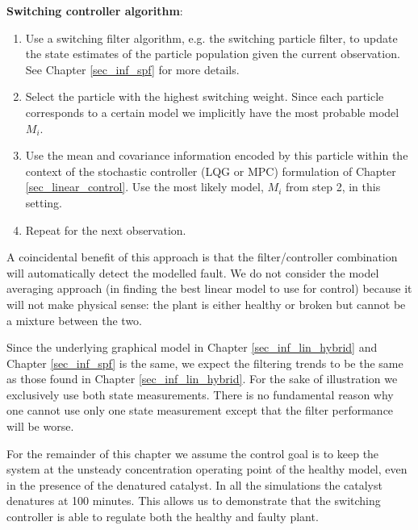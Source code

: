 \textbf{Switching controller algorithm}:
\begin{enumerate}
\item
Use a switching filter algorithm, e.g. the switching particle filter, to update the state estimates of the particle population given the current observation. See Chapter \ref{sec_inf_spf} for more details.
\item
Select the particle with the highest switching weight. Since each particle corresponds to a certain model we implicitly have the most probable model $M_i$.
\item
Use the mean and covariance information encoded by this particle within the context of the stochastic controller (LQG or MPC) formulation of Chapter \ref{sec_linear_control}. Use the most likely model, $M_i$ from step 2, in this setting.
\item
Repeat for the next observation. 
\end{enumerate} 
A coincidental benefit of this approach is that the filter/controller combination will automatically detect the modelled fault. We do not consider the model averaging approach (in finding the best linear model to use for control) because it will not make physical sense: the plant is either healthy or broken but cannot be a mixture between the two.

Since the underlying graphical model in Chapter \ref{sec_inf_lin_hybrid} and Chapter \ref{sec_inf_spf} is the same, we expect the filtering trends to be the same as those found in Chapter \ref{sec_inf_lin_hybrid}. For the sake of illustration we exclusively use both state measurements. There is no fundamental reason why one cannot use only one state measurement except that the filter performance will be worse.

For the remainder of this chapter we assume the control goal is to keep the system at the unsteady concentration operating point of the healthy model, even in the presence of the denatured catalyst. In all the simulations the catalyst denatures at 100 minutes. This allows us to demonstrate that the switching controller is able to regulate both the healthy and faulty plant. 

